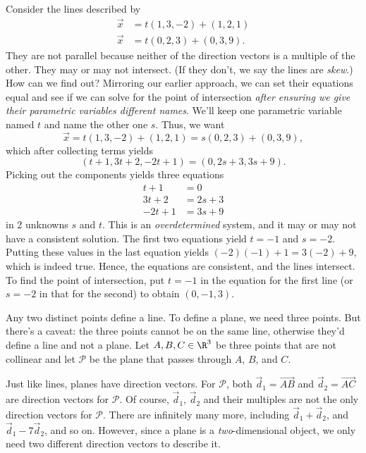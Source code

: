\begin{example}
Consider the lines described by
\begin{align*}
	\vec x &= t(1, 3, -2 ) + ( 1, 2, 1 ) \\
	\vec x &= t( 0, 2, 3) + ( 0, 3, 9 ).
\end{align*}
They are not parallel because neither of the direction
vectors is a multiple
of the other.  They may or may not intersect.  (If they don't,
	we say the lines are \emph{skew}.)  How can we find out?
	Mirroring our earlier approach,
	we can set their equations equal and see if we can solve for the point
	of intersection \emph{after ensuring we give their parametric variables
	different names}.   We'll keep one parametric variable named $t$ and name the
	other one $s$.  Thus, we want
\[
\vec x = t( 1, 3, -2 ) + ( 1, 2, 1 ) =
s( 0, 2, 3) + ( 0, 3, 9 ),
\]
which after collecting terms yields
\[
    ( t + 1, 3t + 2, -2t + 1 ) = ( 0, 2s + 3, 3s + 9).
\]
Picking out the components yields three equations
\begin{align*}
    t + 1 &= 0 \\
    3t +2 &= 2s + 3 \\
    -2t + 1 &=  3s + 9
\end{align*}
in 2 unknowns  $s$ and $t$.  This is an {\it overdetermined\/}
system, and it may or may not have a consistent solution.
The first two equations yield $t = -1$  and $s = -2$.  Putting
these values in the last equation yields $(-2)(-1) + 1 = 3(-2) + 9$,
which is indeed true.
Hence, the equations are consistent, and the lines
intersect.   To find the point of intersection, put $t = -1$
in the equation for the first line (or
$s = -2$ in that for the second) to obtain  $( 0, -1, 3 )$.
\end{example}


Any two distinct points define a line.  To define a plane, we
need three points.  But there's a caveat: the three points cannot
be on the same line, otherwise they'd define a line
and not a plane.  Let $A,B,C\in\R^3$ be three points that are not
collinear and let $\mathcal P$ be the plane that passes through $A$,
$B$, and $C$.

Just like lines, planes have direction vectors.  For $\mathcal P$, both
$\vec d_1=\overrightarrow{AB}$ and $\vec d_2=\overrightarrow{AC}$ are direction
vectors for $\mathcal P$.  Of course, $\vec d_1$, $\vec d_2$ and their multiples
are not the only direction vectors for $\mathcal P$. There are infinitely many more, including
$\vec d_1+\vec d_2$, and $\vec d_1-7\vec d_2$, and so on.  However, since a plane
is a \emph{two}-dimensional object, we only need two different direction vectors to describe it.

